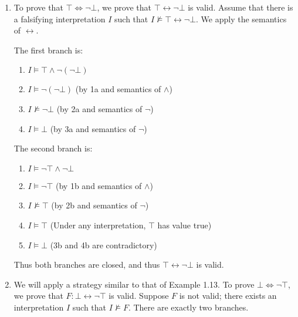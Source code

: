 \begin{exer}[1.2]
    $ $
    \begin{enumerate}[label=(\alph*)]
        \item
            To prove that $\top \Leftrightarrow \neg \bot$, we prove that $\top \leftrightarrow \neg \bot$ is valid.
            Assume that there is a falsifying interpretation $I$ such that $I \not\models \top \leftrightarrow \neg \bot$.
            We apply the semantics of $\leftrightarrow$.

            The first branch is:
            \begin{enumerate}[label=\arabic*a.]
                \item %
                    $I \models \top \land \neg(\neg \bot)$ 
                \item %
                    $I \models \neg(\neg \bot)$ (by 1a and semantics of $\land$)
                \item %
                    $I \not\models \neg \bot$ (by 2a and semantics of $\neg$)
                \item %
                    $I \models \bot$ (by 3a and semantics of $\neg$)
            \end{enumerate}

            The second branch is:
            \begin{enumerate}[label=\arabic*b.]
                \item %
                    $I \models \neg \top \land \neg \bot$ 
                \item %
                    $I \models \neg \top$ (by 1b and semantics of $\land$)
                \item %
                    $I \not\models \top$ (by 2b and semantics of $\neg$)
                \item %
                    $I \models \top$ (Under any interpretation, $\top$ has value true)
                \item %
                    $I \models \bot$ (3b and 4b are contradictory)
            \end{enumerate}
            Thus both branches are closed, and thus $\top \leftrightarrow \neg \bot$ is valid.
        \item
            We will apply a strategy similar to that of Example 1.13.
            To prove $\bot \Leftrightarrow \neg \top$, we prove that $F: \bot \leftrightarrow \neg \top$ is valid.
            Suppose $F$ is not valid; there exists an interpretation $I$ such that $I \not\models F$.
            There are exactly two branches.


\end{enumerate}
\end{exer}
